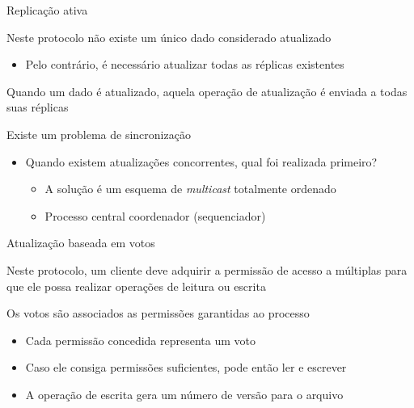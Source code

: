 \documentclass[compress]{beamer}
\begin{document}
\begin{frame}{Replicação ativa}

Neste protocolo não existe um único dado considerado atualizado
\begin{itemize}
    \item Pelo contrário, é necessário atualizar todas as réplicas existentes
\end{itemize}

\vspace{0.5cm}

Quando um dado é atualizado, aquela operação de atualização é enviada a todas suas réplicas

\vspace{0.5cm}

Existe um problema de sincronização
\begin{itemize}
    \item Quando existem atualizações concorrentes, qual foi realizada primeiro?
    \begin{itemize}
        \item A solução é um esquema de \textit{multicast} totalmente ordenado
        \item Processo central coordenador (sequenciador)
    \end{itemize}
\end{itemize}
\end{frame}


\begin{frame}{Atualização baseada em votos}

Neste protocolo, um cliente deve adquirir a permissão de acesso a múltiplas para que ele possa realizar operações de leitura ou escrita

\vspace{0.5cm}

Os votos são associados as permissões garantidas ao processo
\begin{itemize}
    \item Cada permissão concedida representa um voto
    \item Caso ele consiga permissões suficientes, pode então ler e escrever
    \item A operação de escrita gera um número de versão para o arquivo
\end{itemize}

\end{frame}

\end{document}
